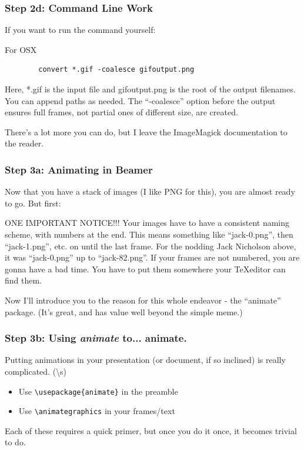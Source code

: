 \documentclass{beamer}
\begin{document}
\begin{frame}[fragile]
	\frametitle{Step 2d: Command Line Work}
	If you want to run the command yourself:
		\begin{block}{For OSX}
		\begin{verbatim}
		convert *.gif -coalesce gifoutput.png
		\end{verbatim}
		Here, *.gif is the input file and gifoutput.png is the root of the output filenames. You can append paths as needed. The ``-coalesce'' option before the output ensures full frames, not partial ones of different size, are created.
		\end{block}
	There's a lot more you can do, but I leave the ImageMagick documentation to the reader.
\end{frame}

\begin{frame}\hypertarget{STEP3a}{}
	\frametitle{Step 3a: Animating in Beamer}
	Now that you have a stack of images (I like PNG for this), you are almost ready to go. But first:
	\begin{block}{ONE IMPORTANT NOTICE!!!}
		Your images have to have a consistent naming scheme, with numbers at the end. This means something like ``jack-0.png'', then ``jack-1.png'', etc. on until the last frame. For the nodding Jack Nicholson above, it was ``jack-0.png'' up to ``jack-82.png''. If your frames are not numbered, you are gonna have a bad time. You have to put them somewhere your \TeX editor can find them.
	\end{block}
	Now I'll introduce you to the reason for this whole endeavor - the ``animate'' package. (It's great, and has value well beyond the simple meme.)
\end{frame}

\begin{frame}[fragile]
	\frametitle{Step 3b: Using \emph{animate} to... animate.}
	Putting animations in your presentation (or document, if so inclined) is really complicated. (\textbackslash s)
		\begin{itemize}
			\item Use \verb+\usepackage{animate}+ in the preamble
			\item Use \verb+\animategraphics+ in your frames/text
		\end{itemize}
	Each of these requires a quick primer, but once you do it once, it becomes trivial to do.
\end{frame}
\end{document}

